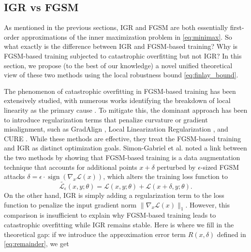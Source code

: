 \documentclass{article}
\begin{document}
\subsection{IGR vs FGSM}

As mentioned in the previous sections, IGR and FGSM are both essentially first-order approximations of the inner maximization problem in \eqref{eq:minimax}. So what exactly is the difference between IGR and FGSM-based training? Why is FGSM-based training subjected to catastrophic overfitting but not IGR? In this section, we propose (to the best of our knowledge) a novel unified theoretical view of these two methods using the local robustness bound \eqref{eq:finlay_bound}. 

The phenomenon of catastrophic overfitting in FGSM-based training has been extensively studied, with numerous works identifying the breakdown of local linearity as the primary cause \cite{wong2020fastbetterfreerevisiting, andriushchenko2020understandingimprovingfastadversarial, kim2020understandingcatastrophicoverfittingsinglestep,rocamora2024efficientlocallinearityregularization}. To mitigate this, the dominant approach has been to introduce regularization terms that penalize curvature or gradient misalignment, such as GradAlign \cite{andriushchenko2020understandingimprovingfastadversarial}, Local Linearization Regularization \cite{qin2019adversarialrobustnesslocallinearization, rocamora2024efficientlocallinearityregularization}, and CURE \cite{moosavidezfooli2018robustnesscurvatureregularizationvice}. While these methods are effective, they treat the FGSM-based training and IGR as distinct optimization goals. Simon-Gabriel et al. \cite{simongabriel2019firstorderadversarialvulnerabilityneural} noted a link between the two methods by showing that FGSM-based training is a data augmentation technique that accounts for additional points $x + \delta$ perturbed by $\epsilon$-sized FGSM attacks $\delta = \epsilon \cdot \operatorname{sign}(\nabla_x \mathcal{L}(x))$, which alters the training loss function to
\begin{equation}
  \tilde{\mathcal{L}_{\epsilon}}(x, y; \theta) = \mathcal{L}(x, y; \theta) + \mathcal{L}(x + \delta, y; \theta).
  \label{eq:fgsm_loss_naive}
\end{equation}
On the other hand, IGR is simply adding a regularization term to the loss function to penalize the input gradient norm $\|\nabla_x \mathcal{L}(x)\|_1$. However, this comparison is insufficient to explain why FGSM-based training leads to catastrophic overfitting while IGR remains stable. Here is where we fill in the theoretical gap: if we introduce the approximation error term $R(x, \delta)$ defined in \eqref{eq:remainder}, we get
\end{document}
